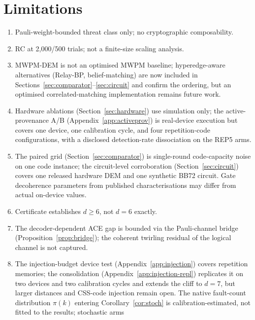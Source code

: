 \documentclass[11pt,a4paper]{article}
\begin{document}
\section{Limitations}
\label{sec:limitations}

\begin{enumerate}[leftmargin=1.4em]
  \item Pauli-weight-bounded threat class only; no cryptographic composability.
  \item RC at 2{,}000/500 trials; not a finite-size scaling analysis.
  \item MWPM-DEM is not an optimised MWPM baseline; hyperedge-aware
    alternatives (Relay-BP, belief-matching) are now included in
    Sections~\ref{sec:comparator}--\ref{sec:circuit} and confirm the
    ordering, but an optimised correlated-matching implementation remains
    future work.
  \item Hardware ablations (Section~\ref{sec:hardware}) use simulation only;
    the active-provenance A/B (Appendix~\ref{app:activeprov}) is real-device
    execution but covers one device, one calibration cycle, and four
    repetition-code configurations, with a disclosed detection-rate
    dissociation on the REP5 arms.
  \item The paired grid (Section~\ref{sec:comparator}) is single-round
    code-capacity noise on one code instance; the circuit-level
    corroboration (Section~\ref{sec:circuit}) covers one released hardware
    DEM and one synthetic BB72 circuit. Gate decoherence parameters from
    published characterisations may differ from actual on-device values.
  \item Certificate establishes $d\ge6$, not $d=6$ exactly.
  \item The decoder-dependent ACE gap is bounded via the Pauli-channel
    bridge (Proposition~\ref{prop:bridge}); the coherent twirling
    residual of the logical channel is not captured.
  \item The injection-budget device test (Appendix~\ref{app:injection})
    covers repetition memories; the consolidation
    (Appendix~\ref{app:injection-repl}) replicates it on two devices and
    two calibration cycles and extends the cliff to $d{=}7$, but larger
    distances and CSS-code injection remain open. The native fault-count
    distribution $\pi(k)$ entering Corollary~\ref{cor:stoch} is
    calibration-estimated, not fitted to the results; stochastic arms

\end{enumerate}
\end{document}

